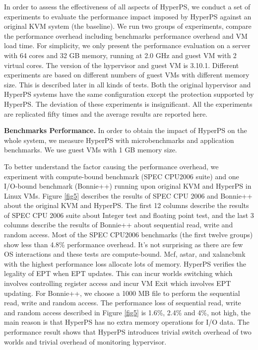 \documentclass[conference]{IEEEtran}
\begin{document}
In order to assess the effectiveness of all aspects of HyperPS, we conduct a set of experiments to evaluate the performance impact imposed by HyperPS against an original KVM system (the baseline). We run two groups of experiments, compare the performance overhead including benchmarks performance overhead and VM load time.
For simplicity, we only present the performance evaluation on a server with 64 cores and 32 GB memory, running at 2.0 GHz and guest VM with 2 virtual cores. The version of the hypervisor and guest VM is 3.10.1. Different experiments are based on different numbers of guest VMs with different memory size.  This is described later in all kinds of tests. Both the original hypervisor and HyperPS systems have the same configuration except the protection supported by HyperPS. The deviation of these experiments is insignificant. All the experiments are replicated fifty times and the average results are reported here.



\textbf{Benchmarks Performance.}
In order to obtain the impact of HyperPS on the whole system, we measure HyperPS with microbenchmarks and application benchmarks. 
We use guest VMs with 1 GB memory size. 

To better understand the factor causing the performance overhead, we experiment with compute-bound benchmark (SPEC CPU2006 suite) and one I/O-bound benchmark (Bonnie++) running upon original KVM and HyperPS in Linux VMs. Figure  \ref{fig5}  describes the results of SPEC CPU 2006 and Bonnie++ about the original KVM and HyperPS. The first 12 columns describe the results of SPEC CPU 2006 suite about Integer test and floating point test, and the last 3 columns describe the results of Bonnie++ about sequential read, write and random access.
 Most of the SPEC CPU2006 benchmarks (the first twelve groups) show less than 4.8\% performance overhead. It's not surprising as there are few OS interactions and these tests are compute-bound. Mcf, astar, and xalancbmk with the highest performance loss allocate lots of memory. HyperPS verifies the legality of EPT when EPT updates. This can incur worlds switching which involves controlling register access and incur VM Exit which involves EPT updating.
 For Bonnie++, we choose a 1000 MB file to perform the sequential read, write and random access. The performance loss of sequential read, write and random access described in Figure \ref{fig5}  is 1.6\%, 2.4\% and 4\%, not high, the main reason is that HyperPS has no extra memory operations for I/O data. The performance result shows that HyperPS introduces trivial switch overhead of two worlds and trivial overhead of monitoring hypervisor.
\end{document}
